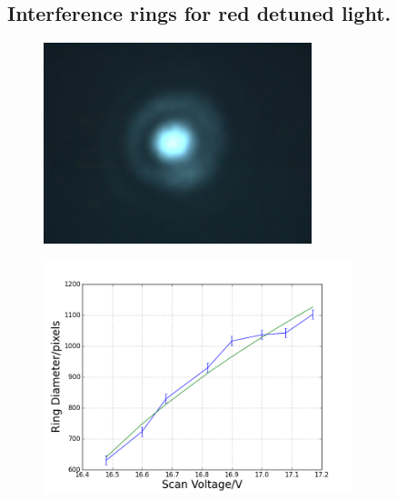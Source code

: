 \documentclass[aps,twocolumn,secnumarabic,balancelastpage,amsmath,amssymb,nofootinbib]{revtex4}
\begin{document}
\subsection{Interference rings for red detuned light.}
\begin{figure}
  \includegraphics[width=7.8cm]{rings.png}
  \caption{}
  \label{rings}
\end{figure}
\begin{figure}
  \includegraphics[width=9cm]{../data/5-16/ring-fit.png}
  \caption{}
  \label{ring_fit}
\end{figure}
\end{document}

